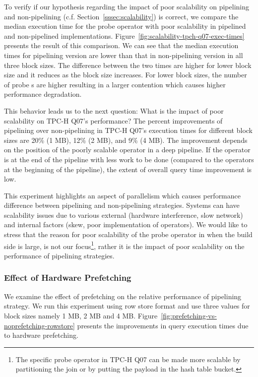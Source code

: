 To verify if our hypothesis regarding the impact of poor scalability on pipelining and non-pipelining (c.f. Section~\ref{sssec:scalability}) is correct, we compare the median \wo{} execution time for the probe operator with poor scalability in pipelined and non-pipelined implementations.
Figure~\ref{fig:scalability-tpch-q07-exec-times} presents the result of this comparison. 
We can see that the median execution times for pipelining version are lower than that in non-pipelining version in all three block sizes.
The difference between the two times are higher for lower block size and it reduces as the block size increases.
For lower block sizes, the number of probe \wo{}s are higher resulting in a larger contention which causes higher performance degradation.

This behavior leads us to the next question: What is the impact of poor scalability on TPC-H Q07's performance?
The percent improvements of pipelining over non-pipelining in TPC-H Q07's execution times for different block sizes are 20\% (1 MB), 12\% (2 MB), and 9\% (4 MB).
The improvement depends on the position of the poorly scalable operator in a deep pipeline.
If the operator is at the end of the pipeline with less work to be done (compared to the operators at the beginning of the pipeline), the extent of overall query time improvement is low. 

This experiment highlights an aspect of parallelism which causes performance difference between pipelining and non-pipelining strategies.
Systems can have scalability issues due to various external (hardware interference, slow network) and internal factors (skew, poor implementation of operators).
We would like to stress that the reason for poor scalability of the probe operator in \sys{} when the build side is large, is not our focus\footnote{The specific probe operator in TPC-H Q07 can be made more scalable by partitioning the join or by putting the payload in the hash table bucket.}, rather it is the impact of poor scalability on the performance of pipelining strategies.

\subsubsection{Effect of Hardware Prefetching}
We examine the effect of prefetching on the relative performance of pipelining strategy. 
We run this experiment using row store format and use three values for block sizes namely 1 MB, 2 MB and 4 MB.
Figure~\ref{fig:prefetching-vs-noprefetching-rowstore} presents the improvements in query execution times due to hardware prefetching. 

